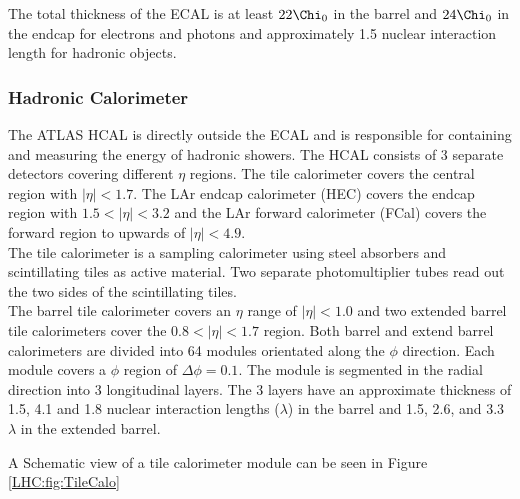 \indent The total thickness of the ECAL is at least $22 \Chi_0$ in the barrel and $24 \Chi_0$ in the endcap for electrons and photons and approximately 1.5 nuclear interaction length for hadronic objects. \\

\subsubsection*{Hadronic Calorimeter}

\indent The ATLAS HCAL is directly outside the ECAL and is responsible for containing and measuring the energy of hadronic showers.  The HCAL consists of 3 separate detectors covering different $\eta$ regions. The tile calorimeter covers the central region with $|\eta| < 1.7$.  The LAr endcap calorimeter (HEC) covers the endcap region with $1.5<|\eta| < 3.2$ and the LAr forward calorimeter (FCal) covers the forward region to upwards of $|\eta| < 4.9$.  \\

\indent The tile calorimeter is a sampling calorimeter using steel absorbers and scintillating tiles as active material. Two separate photomultiplier tubes read out the two sides of the scintillating tiles.  \\

\indent The barrel tile calorimeter covers an $\eta$ range of $|\eta| < 1.0$ and two extended barrel tile calorimeters cover the $0.8 < |\eta| < 1.7$ region.  Both barrel and extend barrel calorimeters are divided into 64 modules orientated along the $\phi$ direction.  Each module covers a $\phi$ region of $\Delta\phi = 0.1$.  The module is segmented in the radial direction into 3 longitudinal layers.  The 3 layers have an approximate thickness of 1.5, 4.1 and 1.8 nuclear interaction lengths ($\lambda$) in the barrel and 1.5, 2.6, and 3.3 $\lambda$ in the extended barrel.  

\indent A Schematic view of a tile calorimeter module can be seen in Figure \ref{LHC:fig:TileCalo}

